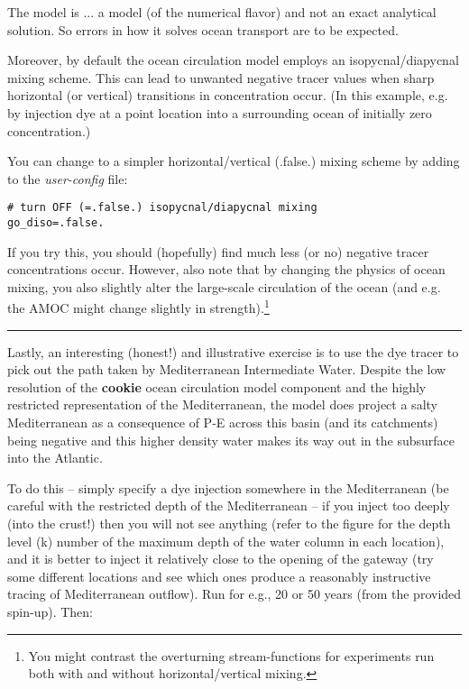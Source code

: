 The model is ... a model (of the numerical flavor) and not an exact analytical solution. So errors in how it solves ocean transport are to be expected.

Moreover, by default the ocean circulation model employs an isopycnal/diapycnal mixing scheme. This can lead to unwanted negative tracer values when sharp horizontal (or vertical) transitions in concentration occur. (In this example, e.g. by injection dye at a point location into a surrounding ocean of initially zero concentration.)

You can change to a simpler horizontal/vertical (.false.) mixing scheme by adding to the \textit{user-config} file:

\vspace{-2mm}\small\begin{verbatim}
# turn OFF (=.false.) isopycnal/diapycnal mixing
go_diso=.false.
\end{verbatim}\normalsize\vspace{-2mm}

If you try this, you should (hopefully) find much less (or no) negative tracer concentrations occur. However, also note that by changing the physics of ocean mixing, you also slightly alter the large-scale circulation of the ocean (and e.g. the AMOC might change slightly in strength).\footnote{You might contrast the overturning stream-functions for experiments run both with and without horizontal/vertical mixing.} 

\vspace{1mm}\noindent\rule{4cm}{0.5pt}\vspace{2mm}

\noindent Lastly, an interesting (honest!) and illustrative exercise is to use the dye tracer to pick out the path taken by Mediterranean Intermediate Water. Despite the low resolution of the \textbf{cookie} ocean circulation model component and the highly restricted representation of the Mediterranean, the model does project a salty Mediterranean as a consequence of  P-E across this basin (and its catchments) being negative and this higher density water makes its way out in the subsurface into the Atlantic.

To do this -- simply specify a dye injection somewhere in the Mediterranean (be careful with the restricted depth of the Mediterranean – if you inject too deeply (into the crust!) then you will not see anything (refer to the figure for the depth level (k) number of the maximum depth of the water column in each location), and it is better to inject it relatively close to the opening of the gateway (try some different locations and see which ones produce a reasonably instructive tracing of Mediterranean outflow). Run for e.g., 20 or 50 years (from the provided spin-up). Then:

